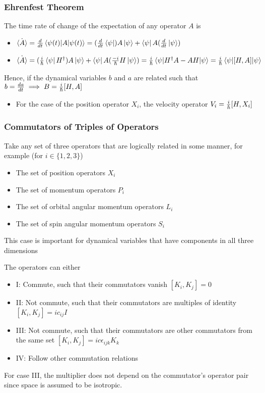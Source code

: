 \documentclass[8pt,t,mathserif,aspectratio=169]{beamer}
\begin{document}
\begin{frame}
  \frametitle{Ehrenfest Theorem}
  \vspace{1mm}
  The time rate of change of the expectation of any operator $A$ is
  \begin{itemize}
    \item $\dot{\expval{A}} = {d \over dt} \expval{A}{\psi(t)} = ({d \over dt} \bra{\psi}) A \ket{\psi} + \bra{\psi} A ({d \over dt} \ket{\psi})$
    \item $\dot{\expval{A}} = ({i \over \hbar} \bra{\psi} H^{\dagger}) A \ket{\psi} + \bra{\psi} A ({-i \over \hbar} H \ket{\psi}) = {i \over \hbar} \expval {H^{\dagger} A - A H}{\psi} = {i \over \hbar} \expval {[H,A]}{\psi}$
  \end{itemize}
  Hence, if the dynamical variables $b$ and $a$ are related such that $b = {da \over dt} \implies B = {i \over \hbar} [H,A]$
  \begin{itemize}
    \item For the case of the position operator $X_i$, the velocity operator $V_i = {i \over \hbar} [H,X_i]$
  \end{itemize}
\end{frame}

\begin{frame}
  \frametitle{Commutators of Triples of Operators}
  \vspace{1mm}
  Take any set of three operators that are logically related in some manner, for example (for $i \in \{1,2,3\}$)
  \begin{itemize}
    \item The set of position operators $X_i$
    \item The set of momentum operators $P_i$
    \item The set of orbital angular momentum operators $L_i$
    \item The set of spin angular momentum operators $S_i$
  \end{itemize}
  This case is important for dynamical variables that have components in all three dimensions

  The operators can either
  \begin{itemize}
    \item I: Commute, such that their commutators vanish $[K_i,K_j] = 0$
    \item II: Not commute, such that their commutators are multiples of identity $[K_i,K_j] = i c_{ij} I$
    \item III: Not commute, such that their commutators are other commutators from the same set $[K_i,K_j] = i c \epsilon_{ijk} K_k$
    \item IV: Follow other commutation relations
  \end{itemize}
  For case III, the multiplier does not depend on the commutator's operator pair since space is assumed to be isotropic. 
\end{frame}
\end{document}
